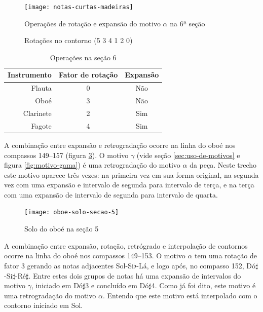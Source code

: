 \begin{figure}
  \centering
    \texttt{[image: notas-curtas-madeiras]}
    \caption{Operações de rotação e expansão do motivo $\alpha$ na 6ª
    seção}
  \label{fig:notas-curtas-madeiras}
\end{figure}

\begin{figure}
  \centering
  \subfloat[Rotação 2: (4 1 2 0 5 3)]{
    \texttt{[image: c-412053]}
    \label{fig:412053}  
  }
  \subfloat[Rotação 3: (1 2 0 5 3 4)]{
    \texttt{[image: c-120534]}
    \label{fig:120534}  
  }
  \subfloat[Rotação 4: (2 0 5 3 4 1)]{
    \texttt{[image: c-205341]}
    \label{fig:205341}  
  }
  \caption{Rotações no contorno (5 3 4 1 2 0)}
  \label{fig:rotacoes-534120}
\end{figure}

\begin{table}
  \centering
  \begin{tabular}{r|cc}
    Instrumento & Fator de rotação & Expansão \\
    \hline
    Flauta & 0 & Não \\
    Oboé & 3 & Não \\
    Clarinete & 2 & Sim \\
    Fagote & 4 & Sim \\
  \end{tabular}
  \caption{Operações na seção 6}
  \label{tab:operacoes-secao-6}
\end{table}

A combinação entre expansão e retrogradação ocorre na linha do oboé
nos compassos 149--157 (figura \ref{fig:oboe-solo-secao-5}). O motivo
$\gamma$ (vide seção \ref{sec:uso-de-motivos} e figura
\ref{fig:motivo-gama}) é uma retrogradação do motivo $\alpha$ da
peça. Neste trecho este motivo aparece três vezes: na primeira vez em
sua forma original, na segunda vez com uma expansão e intervalo de
segunda para intervalo de terça, e na terça com uma expansão de
intervalo de segunda para intervalo de quarta.

\begin{figure}
  \centering
  \texttt{[image: oboe-solo-secao-5]}
  \caption{Solo do oboé na seção 5}
  \label{fig:oboe-solo-secao-5}
\end{figure}

A combinação entre expansão, rotação, retrógrado e interpolação de
contornos ocorre na linha do oboé nos compassos 149--153. O motivo
$\alpha$ tem uma rotação de fator 3 gerando as notas adjacentes
Sol-Si$\flat$-Lá, e logo após, no compasso 152,
Dó$\sharp$-Si$\sharp$-Ré$\sharp$. Entre estes dois grupos de notas há
uma expansão de intervalos do motivo $\gamma$, iniciado em Dó$\sharp$3
e concluído em Dó$\sharp$4. Como já foi dito, este motivo é uma
retrogradação do motivo $\alpha$. Entendo que este motivo está
interpolado com o contorno iniciado em Sol.

